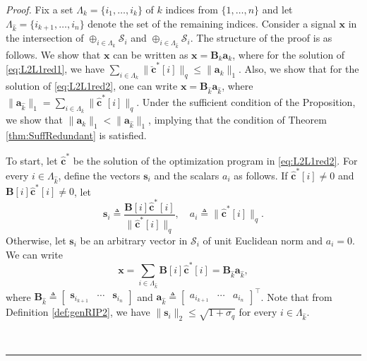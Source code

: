 \documentclass[10pt,twocolumn,twoside] {IEEEtran}
\newenvironment{proof}{\emph{Proof.}}{\hfill{~\rule[-1pt]{5pt}{5pt}\par\medskip}}
\begin{document}
{\begin{proof}
Fix a set $\Lambda_k = \{i_1,\ldots,i_k\}$ of $k$ indices from $\{1, \ldots, n \}$ and let $\Lambda_{\widehat{k}} = \{i_{k+1},\ldots,i_n\}$ denote the set of the remaining indices. Consider a signal ${{\mathbf x}}$ in the intersection of $\oplus_{i \in \Lambda_k} \mathcal{S}_i$ and $\oplus_{i \in \Lambda_{\widehat{k}}} \mathcal{S}_i$. The structure of the proof is as follows. We show that ${{\mathbf x}}$ can be written as ${{\mathbf x}} = {\boldsymbol{B}}_{k} {\boldsymbol{a}}_{k}$, where for the solution of \eqref{eq:L2L1red1}, we have $\sum_{i \in \Lambda_{k}}{\| \breve{\boldsymbol{c}}^{*}[i] \|_q} \leq \| {\boldsymbol{a}}_{k} \|_1$. Also, we show that for the solution of \eqref{eq:L2L1red2}, one can write ${{\mathbf x}} = {\boldsymbol{B}}_{\widehat{k}} {\boldsymbol{a}}_{\widehat{k}}$, where $\| {\boldsymbol{a}}_{\widehat{k}} \|_1 = \sum_{i \in \Lambda_{\widehat{k}}}{\| \widehat{\boldsymbol{c}}^{*}[i] \|_q}$. Under the sufficient condition of the Proposition, we show that $\| {\boldsymbol{a}}_k \|_1 < \| {\boldsymbol{a}}_{\widehat{k}} \|_1$, implying that the condition of Theorem \ref{thm:SuffRedundant} is satisfied.

To start, let $\widehat{\boldsymbol{c}}^*$ be the solution of the optimization program in \eqref{eq:L2L1red2}. For every $i \in \Lambda_{\widehat{k}}$, define the vectors ${\boldsymbol{s}}_i$ and the scalars $a_i$ as follows. If $\widehat{\boldsymbol{c}}^*[i] \neq 0$ and ${\boldsymbol{B}}[i] \widehat{\boldsymbol{c}}^*[i] \neq 0$, let 
\begin{equation}
{\boldsymbol{s}}_i \triangleq \frac{{\boldsymbol{B}}[i] \widehat{\boldsymbol{c}}^*[i]}{ \| \widehat{\boldsymbol{c}}^*[i] \|_q }, \quad a_i \triangleq \| \widehat{\boldsymbol{c}}^*[i] \|_q. 
\end{equation}
Otherwise, let ${\boldsymbol{s}}_i$ be an arbitrary vector in $\mathcal{S}_i$ of unit Euclidean norm and $a_i = 0$. We can write
\begin{equation}
\label{eq:op2}
{{\mathbf x}} = \sum_{i \in \Lambda_{\widehat{k}}} {\boldsymbol{B}}[i] \widehat{\boldsymbol{c}}^*[i] = {\boldsymbol{B}}_{\widehat{k}} {\boldsymbol{a}}_{\widehat{k}},
\end{equation}
where ${\boldsymbol{B}}_{\widehat{k}} \triangleq \begin{bmatrix} {\boldsymbol{s}}_{i_{k+1}} \!\!& \cdots \!\!& {\boldsymbol{s}}_{i_n} \end{bmatrix}$ and ${\boldsymbol{a}}_{\widehat{k}} \triangleq \begin{bmatrix} a_{i_{k+1}} \!\! & \cdots \!\! & a_{i_n} \end{bmatrix}^{\top}$. Note that from Definition \ref{def:genRIP2}, we have $\| {\boldsymbol{s}}_{i} \|_2 \leq \sqrt{1 + \sigma_q}$ for every $i \in \Lambda_{\widehat{k}}$. 


\end{proof}}
\end{document}
